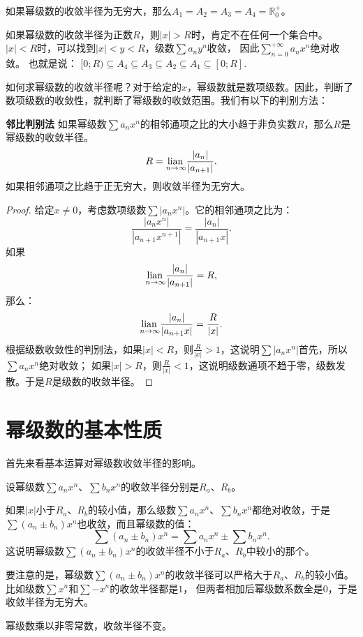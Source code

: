\documentclass[12pt,UTF8]{ctexbook}
\begin{document}
\begin{appendix}
如果幂级数的收敛半径为无穷大，那么$A_1 = A_2 = A_3 = A_4 = \mathbb{R}_0^+$。

如果幂级数的收敛半径为正数$R$，则$|x|>R$时，肯定不在任何一个集合中。$|x|<R$时，可以找到$|x|<y<R$，级数$\sum a_n y^n$收敛，
因此$\sum_{n=0}^{+\infty} a_n x^n$绝对收敛。
也就是说：
$[0;R) \subseteq A_4\subseteq A_3 \subseteq A_2\subseteq A_1 \subseteq [0;R].$

如何求幂级数的收敛半径呢？对于给定的$x$，幂级数就是数项级数。因此，判断了数项级数的收敛性，就判断了幂级数的收敛范围。我们有以下的判别方法：

\begin{tm}{\textbf{邻比判别法}}
    如果幂级数$\sum a_n x^n$的相邻通项之比的大小趋于非负实数$R$，那么$R$是幂级数的收敛半径。
    $$ R = \underset{n\to\infty}{\operatorname{lian}\,} \frac{|a_n|}{|a_{n+1}|}. $$
    如果相邻通项之比趋于正无穷大，则收敛半径为无穷大。
\end{tm}

\begin{proof}
    给定$x\neq 0$，考虑数项级数$\sum |a_n x^n|$。它的相邻通项之比为：
    $$ \frac{|a_n x^n|}{|a_{n+1} x^{n+1}|} = \frac{|a_n|}{|a_{n+1}x|}. $$
    如果
    $$ \underset{n\to\infty}{\operatorname{lian}\,} \frac{|a_n|}{|a_{n+1}|} = R,$$
    那么：
    $$ \underset{n\to\infty}{\operatorname{lian}\,} \frac{|a_n|}{|a_{n+1}x|} = \frac{R}{|x|}.$$
    根据级数收敛性的判别法，如果$|x|<R$，则$\frac{R}{|x|} > 1$，这说明$\sum |a_n x^n|$首先，所以$\sum a_n x^n$绝对收敛；
    如果$|x|>R$，则$\frac{R}{|x|} < 1$，这说明级数通项不趋于零，级数发散。于是$R$是级数的收敛半径。
\end{proof}

\section{幂级数的基本性质}

首先来看基本运算对幂级数收敛半径的影响。

设幂级数$\sum a_n x^n$、$\sum b_n x^n$的收敛半径分别是$R_a$、$R_b$。

如果$|x|$小于$R_a$、$R_b$的较小值，那么级数$\sum a_n x^n$、$\sum b_n x^n$都绝对收敛，于是
$\sum (a_n \pm b_n) x^n$也收敛，而且幂级数的值：
$$\sum (a_n \pm b_n) x^n = \sum a_n x^n \pm \sum b_n x^n.$$
这说明幂级数$\sum (a_n \pm b_n) x^n$的收敛半径不小于$R_a$、$R_b$中较小的那个。

要注意的是，幂级数$\sum (a_n \pm b_n) x^n$的收敛半径可以严格大于$R_a$、$R_b$的较小值。比如级数$\sum x^n$和$\sum -x^n$的收敛半径都是$1$，
但两者相加后幂级数系数全是$0$，于是收敛半径为无穷大。

幂级数乘以非零常数，收敛半径不变。


\end{appendix}
\end{document}
